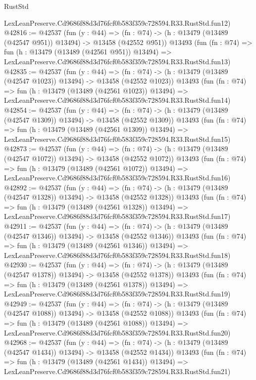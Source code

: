 \begin{lexlean}{RustStd}
\begin{coremodule}
    LexLeanPreserve.Cd9686f88d3d76fcf0b583f359c728594.R33.RustStd.fun12)
@42816 := @42537
    (fun (y : @44) =>
    (fn : @74) -> (h : @13479 (@13489 (@42547 @951)) @13494) -> @13458 (@42552 @951))
    @13493
    (fun (fn : @74) =>
    fun (h : @13479 (@13489 (@42561 @951)) @13494) =>
    LexLeanPreserve.Cd9686f88d3d76fcf0b583f359c728594.R33.RustStd.fun13)
@42835 := @42537
    (fun (y : @44) =>
    (fn : @74) -> (h : @13479 (@13489 (@42547 @1023)) @13494) -> @13458 (@42552 @1023))
    @13493
    (fun (fn : @74) =>
    fun (h : @13479 (@13489 (@42561 @1023)) @13494) =>
    LexLeanPreserve.Cd9686f88d3d76fcf0b583f359c728594.R33.RustStd.fun14)
@42854 := @42537
    (fun (y : @44) =>
    (fn : @74) -> (h : @13479 (@13489 (@42547 @1309)) @13494) -> @13458 (@42552 @1309))
    @13493
    (fun (fn : @74) =>
    fun (h : @13479 (@13489 (@42561 @1309)) @13494) =>
    LexLeanPreserve.Cd9686f88d3d76fcf0b583f359c728594.R33.RustStd.fun15)
@42873 := @42537
    (fun (y : @44) =>
    (fn : @74) -> (h : @13479 (@13489 (@42547 @1072)) @13494) -> @13458 (@42552 @1072))
    @13493
    (fun (fn : @74) =>
    fun (h : @13479 (@13489 (@42561 @1072)) @13494) =>
    LexLeanPreserve.Cd9686f88d3d76fcf0b583f359c728594.R33.RustStd.fun16)
@42892 := @42537
    (fun (y : @44) =>
    (fn : @74) -> (h : @13479 (@13489 (@42547 @1328)) @13494) -> @13458 (@42552 @1328))
    @13493
    (fun (fn : @74) =>
    fun (h : @13479 (@13489 (@42561 @1328)) @13494) =>
    LexLeanPreserve.Cd9686f88d3d76fcf0b583f359c728594.R33.RustStd.fun17)
@42911 := @42537
    (fun (y : @44) =>
    (fn : @74) -> (h : @13479 (@13489 (@42547 @1346)) @13494) -> @13458 (@42552 @1346))
    @13493
    (fun (fn : @74) =>
    fun (h : @13479 (@13489 (@42561 @1346)) @13494) =>
    LexLeanPreserve.Cd9686f88d3d76fcf0b583f359c728594.R33.RustStd.fun18)
@42930 := @42537
    (fun (y : @44) =>
    (fn : @74) -> (h : @13479 (@13489 (@42547 @1378)) @13494) -> @13458 (@42552 @1378))
    @13493
    (fun (fn : @74) =>
    fun (h : @13479 (@13489 (@42561 @1378)) @13494) =>
    LexLeanPreserve.Cd9686f88d3d76fcf0b583f359c728594.R33.RustStd.fun19)
@42949 := @42537
    (fun (y : @44) =>
    (fn : @74) -> (h : @13479 (@13489 (@42547 @1088)) @13494) -> @13458 (@42552 @1088))
    @13493
    (fun (fn : @74) =>
    fun (h : @13479 (@13489 (@42561 @1088)) @13494) =>
    LexLeanPreserve.Cd9686f88d3d76fcf0b583f359c728594.R33.RustStd.fun20)
@42968 := @42537
    (fun (y : @44) =>
    (fn : @74) -> (h : @13479 (@13489 (@42547 @1434)) @13494) -> @13458 (@42552 @1434))
    @13493
    (fun (fn : @74) =>
    fun (h : @13479 (@13489 (@42561 @1434)) @13494) =>
    LexLeanPreserve.Cd9686f88d3d76fcf0b583f359c728594.R33.RustStd.fun21)

\end{coremodule}
\end{lexlean}
